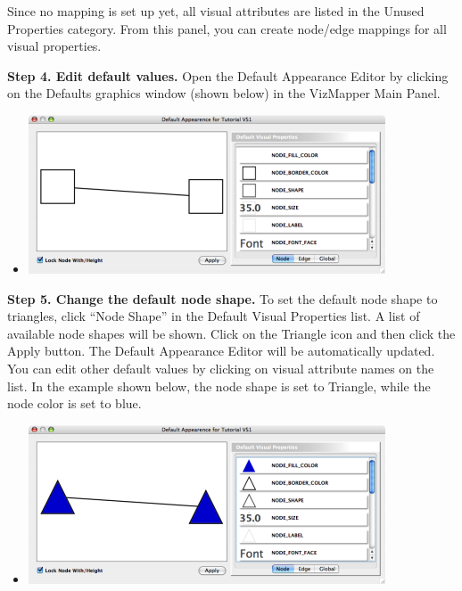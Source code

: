  Since no mapping is set up yet, all visual attributes are listed in the Unused Properties category. From this panel, you can create node/edge mappings for all visual properties. 


 \textbf{Step 4. Edit default values.}
 Open the Default Appearance Editor by clicking on the Defaults graphics window (shown below) in the VizMapper Main Panel. 
\begin{itemize}
\item 

 \includegraphics[width=.6\textwidth]{images/InitialDefaultEditor.png} 


\end{itemize}


 \textbf{Step 5. Change the default node shape.}
 To set the default node shape to triangles, click ``Node Shape'' in the Default Visual Properties list. A list of available node shapes will be shown. Click on the Triangle icon and then click the Apply button. The Default Appearance Editor will be automatically updated. You can edit other default values by clicking on visual attribute names on the list. In the example shown below, the node shape is set to Triangle, while the node color is set to blue. 
\begin{itemize}
\item 

 \includegraphics[width=.6\textwidth]{images/TriangleDefaultEditor.png} 


\end{itemize}


